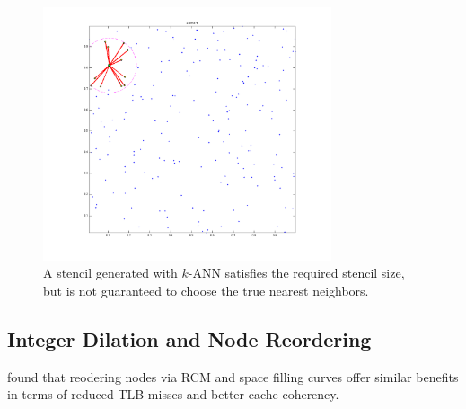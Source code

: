 \documentclass{report}
\begin{document}
\begin{figure}
\centering
\includegraphics[width=8.5cm]{rbffd_methods_content/neighbors/neighbor_incorrect.png}
\caption{A stencil generated with $k$-ANN satisfies the required stencil size, but is not guaranteed to choose the true nearest neighbors.}
\label{fig:approximate_nearest_neighbors}
\end{figure}




\subsection{Integer Dilation and Node Reordering}

\cite{MellorCrummey2001} found that reodering nodes via RCM and space filling curves offer similar benefits in terms of reduced TLB misses and better cache coherency. 
\end{document}
